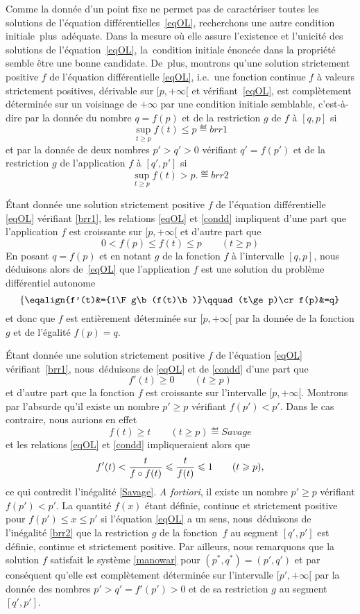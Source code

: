 Comme la donn\'ee d'un point fixe ne permet pas de caract\'eriser toutes les solutions de l'\'equation diff\'erentielles~\eqref{eqOL}, 
recherchons une autre condition initiale~plus~ad\'equate. 
Dans la mesure o\`u elle assure l'existence et l'unicit\'e des solutions de l'\'equation~\eqref{eqOL}, 
la~condition initiale \'enonc\'ee dans la propri\'et\'e  semble \^etre une bonne candidate. De~plus,  
montrons qu'une solution strictement positive $f$ de l'\'equation diff\'erentielle \eqref{eqOL}, 
i.e.~une fonction continue $f$ \`a valeurs strictement positives, d\'erivable sur $[p,+\infty[$ et  v\'erifiant~\eqref{eqOL},  
est compl\`etement d\'etermin\'ee sur un voisinage de $+\infty$ par une condition initiale semblable, 
c'est-\`a-dire par la donn\'ee du nombre $q=f(p)$ et de la restriction $g$ de $f$ \`a $[q,p]$ si 
$$
\sup_{t\ge p}f(t)\le p \eqdef{brr1}
$$
et par la donn\'ee de deux nombres $p'>q'>0$ v\'erifiant $q'=f(p')$ et de la restriction $g$ de l'application $f$ \`a $[q',p']$ si
$$
\sup_{t\ge p}f(t)>p.\eqdef{brr2}
$$ 

\'Etant donn\'ee une solution strictement positive $f$ de l'\'equation diff\'erentielle \eqref{eqOL} v\'erifiant \eqref{brr1}, 
les relations \eqref{eqOL} et \eqref{condd} impliquent d'une part que l'application $f$ est croissante sur $[p,+\infty[$ et d'autre part que 
$$
0<f(p)\le f(t)\le p\qquad(t\ge p)
$$
En posant $q=f(p)$ et en notant $g$ de la fonction $f$ \`a l'intervalle $[q,p]$, nous d\'eduisons alors de~\eqref{eqOL} que l'application $f$ 
est une solution du probl\`eme diff\'erentiel autonome 
$$
\Q\{\eqalign{f'(t)&={1\F g\b(f(t)\b)}\qquad(t\ge p)\cr f(p)&=q}\W.
$$
et donc que $f$ est enti\`erement d\'etermin\'ee sur $[p,+\infty[$ par la donn\'ee de la fonction $g$ et de l'\'egalit\'e $f(p)=q$. 
\bigskip

\'Etant donn\'ee une solution strictement positive $f$ de l'\'equation \eqref{eqOL} v\'erifiant~\eqref{brr1}, 
nous~d\'eduisons de \eqref{eqOL} et de \eqref{condd} d'une part que 
$$
f'(t)\ge0\qquad(t\ge p)
$$
et d'autre part que la fonction $f$ est croissante sur l'intervalle $[p,+\infty[$. Montrons par l'absurde qu'il existe 
un nombre $p'\ge p$ v\'erifiant $f(p')<p'$. Dans le cas contraire, nous aurions en effet  
$$
f(t)\ge t\qquad(t\ge p) \eqdef{Savage}
$$ 
et les relations \eqref{eqOL} et \eqref{condd} impliqueraient alors que 
$$
f'(t)<{t\over f\circ f(t)}\leqslant {t\over f(t)}\leqslant 1\qquad(t\geqslant p), 
$$
ce qui contredit l'in\'egalit\'e \eqref{Savage}. {\it A fortiori}, il existe un nombre $p'\ge p$ v\'erifiant $f(p')<p'$. 
La quantit\'e $f(x)$ \'etant d\'efinie, continue et strictement positive pour $f(p')\le x\le p'$ si l'\'equation \eqref{eqOL} a un sens, 
nous~d\'eduisons de l'in\'egalit\'e \eqref{brr2} que la restriction $g$ de la fonction~$f$ au segment $[q',p']$ est d\'efinie, continue et strictement positive. 
Par ailleurs, nous remarquons 
que la solution $f$ satisfait le syst\`eme \eqref{manowar} pour $(p^*,q^*)=(p',q')$ et par cons\'equent qu'elle est compl\`etement d\'etermin\'ee sur l'intervalle $[p',+\infty[$ par la donn\'ee des nombres $p'>q'=f'(p')>0$ et de sa restriction $g$ au segment  $[q',p']$. 
\bigskip


